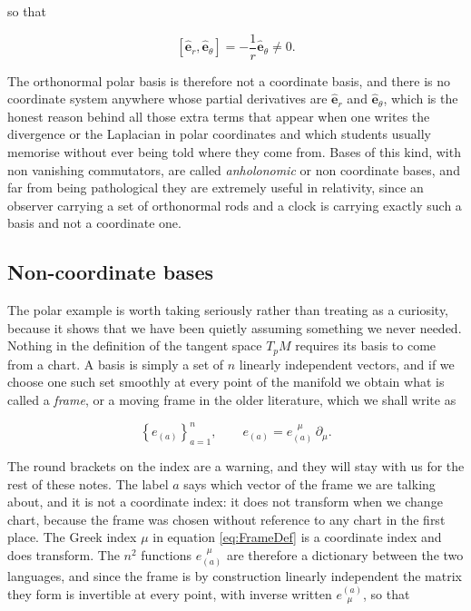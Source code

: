         so that

        \begin{equation}
            \left[\hat{\mathbf{e}}_r,\hat{\mathbf{e}}_{\theta}\right] = -\frac{1}{r}\hat{\mathbf{e}}_{\theta} \neq 0.
        \end{equation}

        The orthonormal polar basis is therefore not a coordinate basis, and there is no coordinate system anywhere whose partial derivatives are $\hat{\mathbf{e}}_r$ and $\hat{\mathbf{e}}_{\theta}$, which is the honest reason behind all those extra terms that appear when one writes the divergence or the Laplacian in polar coordinates and which students usually memorise without ever being told where they come from. Bases of this kind, with non vanishing commutators, are called \textit{anholonomic} or non coordinate bases, and far from being pathological they are extremely useful in relativity, since an observer carrying a set of orthonormal rods and a clock is carrying exactly such a basis and not a coordinate one.

    \subsection{Non-coordinate bases}

        The polar example is worth taking seriously rather than treating as a curiosity, because it shows that we have been quietly assuming something we never needed. Nothing in the definition of the tangent space $T_pM$ requires its basis to come from a chart. A basis is simply a set of $n$ linearly independent vectors, and if we choose one such set smoothly at every point of the manifold we obtain what is called a \textit{frame}, or a moving frame in the older literature, which we shall write as

        \begin{equation}\label{eq:FrameDef}
            \left\{e_{(a)}\right\}_{a=1}^{n}, \qquad e_{(a)} = e_{(a)}^{\;\;\mu}\,\partial_{\mu}.
        \end{equation}

        The round brackets on the index are a warning, and they will stay with us for the rest of these notes. The label $a$ says which vector of the frame we are talking about, and it is not a coordinate index: it does not transform when we change chart, because the frame was chosen without reference to any chart in the first place. The Greek index $\mu$ in equation \ref{eq:FrameDef} is a coordinate index and does transform. The $n^2$ functions $e_{(a)}^{\;\;\mu}$ are therefore a dictionary between the two languages, and since the frame is by construction linearly independent the matrix they form is invertible at every point, with inverse written $e^{(a)}_{\;\;\mu}$, so that

